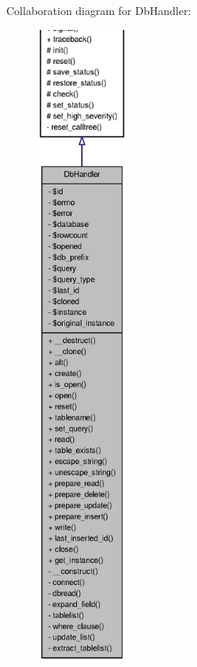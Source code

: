 Collaboration diagram for DbHandler:
\nopagebreak
\begin{figure}[H]
\begin{center}
\leavevmode
\includegraphics[height=600pt]{classDbHandler__coll__graph}
\end{center}
\end{figure}
